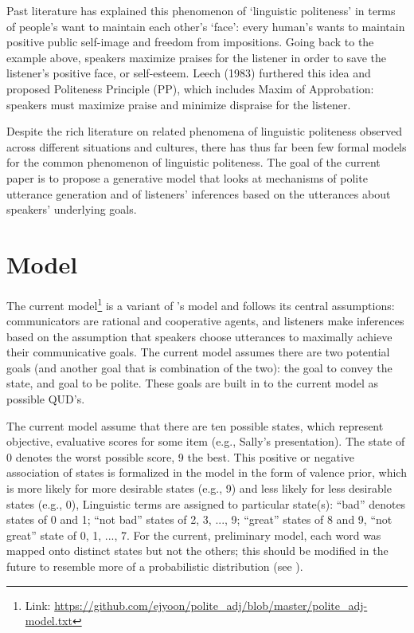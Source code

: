 \documentclass[10pt,letterpaper]{article}
\begin{document}
Past literature has explained this phenomenon of `linguistic politeness' in terms of people's want to maintain each other's `face': every human's wants to maintain positive public self-image and freedom from impositions. Going back to the example above, speakers maximize praises for the listener in order to save the listener's positive face, or self-esteem. Leech (1983) furthered this idea and proposed Politeness Principle (PP), which includes Maxim of Approbation: speakers must maximize praise and minimize dispraise for the listener. 

Despite the rich literature on related phenomena of linguistic politeness observed across different situations and cultures, there has thus far been few formal models for the common phenomenon of linguistic politeness. The goal of the current paper is to propose a generative model that looks at mechanisms of polite utterance generation and of listeners' inferences based on the utterances about speakers' underlying goals. 

\section{Model}
The current model\footnote{Link: \url{https://github.com/ejyoon/polite\_adj/blob/master/polite\_adj-model.txt}} is a variant of 's model and follows its central assumptions: communicators are rational and cooperative agents, and listeners make inferences based on the assumption that speakers choose utterances to maximally achieve their communicative goals. The current model assumes there are two potential goals (and another goal that is combination of the two): the goal to convey the state, and goal to be polite. These goals are built in to the current model as possible QUD's.

The current model assume that there are ten possible states, which represent objective, evaluative scores for some item (e.g., Sally's presentation). The state of 0 denotes the worst possible score, 9 the best. This positive or negative association of states is formalized in the model in the form of valence prior, which is more likely for more desirable states (e.g., 9) and less likely for less desirable states (e.g., 0), Linguistic terms are assigned to particular state(s): ``bad'' denotes states of 0 and 1; ``not bad'' states of 2, 3, ..., 9; ``great'' states of 8 and 9, ``not great'' state of 0, 1, ..., 7. For the current, preliminary model, each word was mapped onto distinct states but not the others; this should be modified in the future to resemble more of a probabilistic distribution (see ).
\end{document}
